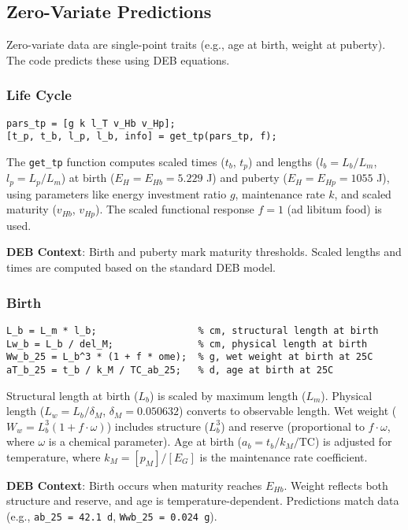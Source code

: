 \documentclass[11pt]{article}
\begin{document}
\subsection{Zero-Variate Predictions}
Zero-variate data are single-point traits (e.g., age at birth, weight at puberty). The code predicts these using DEB equations.

\subsubsection{Life Cycle}
\begin{verbatim}
pars_tp = [g k l_T v_Hb v_Hp];
[t_p, t_b, l_p, l_b, info] = get_tp(pars_tp, f);
\end{verbatim}
The \texttt{get\_tp} function computes scaled times ($t_b$, $t_p$) and lengths ($l_b = L_b / L_m$, $l_p = L_p / L_m$) at birth ($E_H = E_{Hb} = 5.229$ J) and puberty ($E_H = E_{Hp} = 1055$ J), using parameters like energy investment ratio $g$, maintenance rate $k$, and scaled maturity ($v_{Hb}$, $v_{Hp}$). The scaled functional response $f = 1$ (ad libitum food) is used.

\textbf{DEB Context}: Birth and puberty mark maturity thresholds. Scaled lengths and times are computed based on the standard DEB model.

\subsubsection{Birth}
\begin{verbatim}
L_b = L_m * l_b;                  % cm, structural length at birth
Lw_b = L_b / del_M;               % cm, physical length at birth
Ww_b_25 = L_b^3 * (1 + f * ome);  % g, wet weight at birth at 25C
aT_b_25 = t_b / k_M / TC_ab_25;   % d, age at birth at 25C
\end{verbatim}
Structural length at birth ($L_b$) is scaled by maximum length ($L_m$). Physical length ($L_w = L_b / \delta_M$, $\delta_M = 0.050632$) converts to observable length. Wet weight ($W_w = L_b^3 (1 + f \cdot \omega)$) includes structure ($L_b^3$) and reserve (proportional to $f \cdot \omega$, where $\omega$ is a chemical parameter). Age at birth ($a_b = t_b / k_M / \text{TC}$) is adjusted for temperature, where $k_M = [p_M] / [E_G]$ is the maintenance rate coefficient.

\textbf{DEB Context}: Birth occurs when maturity reaches $E_{Hb}$. Weight reflects both structure and reserve, and age is temperature-dependent. Predictions match data (e.g., \texttt{ab\_25 = 42.1 d}, \texttt{Wwb\_25 = 0.024 g}).
\end{document}
